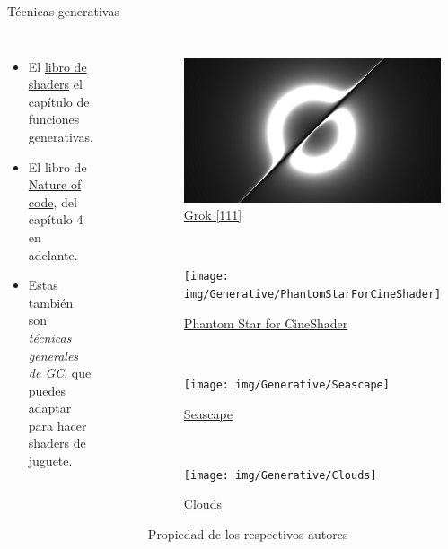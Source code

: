 \begin{frame}{Técnicas generativas}
\begin{columns}
    \begin{itemize}
         \item El \href{https://thebookofshaders.com/10/}{libro de shaders} el capítulo de funciones generativas.
         \item El libro de \href{https://natureofcode.com/}{Nature of code}, del capítulo 4 en adelante.
         \item Estas también son \emph{técnicas generales de GC}, que puedes adaptar para hacer shaders de juguete.
     \end{itemize}
\begin{figure}[htp]
 \centering
 \begin{subfigure}[b]{0.42\textwidth}
   \includegraphics[width=\textwidth]{img/Generative/Grok111}
   \caption{\href{https://www.shadertoy.com/view/wc23Wc}{Grok [111]}}
 \end{subfigure}
~
 \begin{subfigure}[b]{0.42\textwidth}
   \texttt{[image: img/Generative/PhantomStarForCineShader]}
   \caption{\href{https://www.shadertoy.com/view/ttKGDt}{Phantom Star for CineShader}}
 \end{subfigure}
\\
 \begin{subfigure}[b]{0.42\textwidth}
   \texttt{[image: img/Generative/Seascape]}
   \caption{\href{https://www.shadertoy.com/view/Ms2SD1}{Seascape}}
 \end{subfigure}
~
 \begin{subfigure}[b]{0.42\textwidth}
   \texttt{[image: img/Generative/Clouds]}
   \caption{\href{https://www.shadertoy.com/view/XslGRr}{Clouds}}
 \end{subfigure}
 \caption{Propiedad de los respectivos autores}
\end{figure}
\end{columns}
\end{frame}

